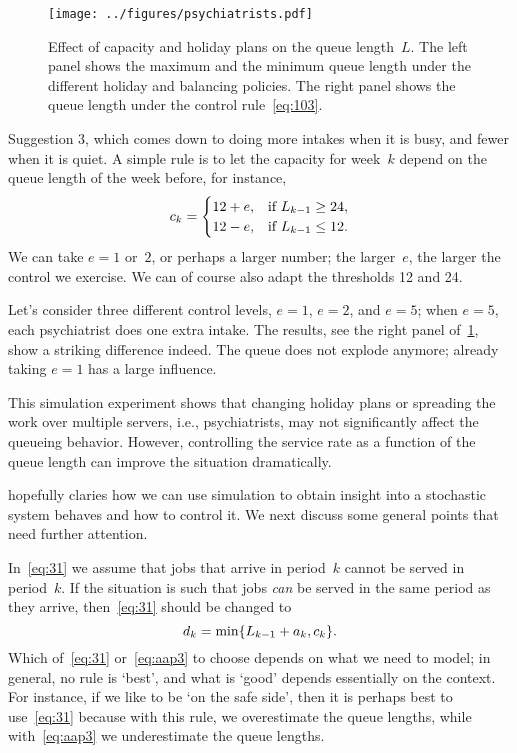 \documentclass[stochastic-or.tex]{subfiles}
\begin{document}
\begin{figure}[t]
\centering
\texttt{[image: ../figures/psychiatrists.pdf]}
\caption{Effect of capacity and holiday plans on the queue length~$L$.
The left panel shows the maximum and the minimum queue length under the different holiday and balancing policies.
The right panel shows the queue length under the control rule~\cref{eq:103}.}
\label{fig:psychiatrists}
\end{figure}



 Suggestion 3, which comes down to doing more intakes when it is busy, and fewer when it is quiet.
A simple rule is to let the capacity  for week~$k$ depend on the queue length of the week before, for instance,
\begin{equation}\label{eq:103}
  c_k =
  \begin{cases}
    12 + e, & \text{if } L_{k-1} \geq 24, \\
    12 - e, & \text{if } L_{k-1} \leq 12.
  \end{cases}
\end{equation}
We can take  $e=1$ or~$2$, or perhaps a larger number; the larger~$e$, the larger the control we exercise. We can of course also adapt the thresholds 12 and 24.

Let's consider three different control levels, $e=1$, $e=2$, and $e=5$; when $e=5$, each psychiatrist does one extra intake.
The results, see the right panel of~\cref{fig:psychiatrists}, show a striking difference indeed.
The queue does not explode anymore;  already taking $e=1$ has a large influence.



This simulation experiment shows that changing holiday plans or spreading the work over multiple servers, i.e., psychiatrists, may not significantly affect the queueing behavior.
However, controlling the service rate as a function of the queue length can improve the situation dramatically.


 hopefully claries how we can use simulation to obtain insight into a stochastic system behaves and how to control it. We next discuss some general points that need further attention.

In~\cref{eq:31} we assume that jobs that arrive in period~$k$ cannot be served in period~$k$.
If the situation is such that jobs \emph{can} be served in the same period as they arrive, then~\cref{eq:31} should be changed to
\begin{equation}\label{eq:aap3}
d_k = \min\{L_{k-1}+a_{k}, c_k\}.
\end{equation}
Which of~\cref{eq:31} or~\cref{eq:aap3} to choose depends on what we need to model; in general,  no rule is `best', and what is `good' depends essentially on the context.
For instance, if we like to be `on the safe side', then it is perhaps best to use~\cref{eq:31} because with this rule, we overestimate the queue lengths, while with~\cref{eq:aap3} we underestimate the queue lengths.
\end{document}

